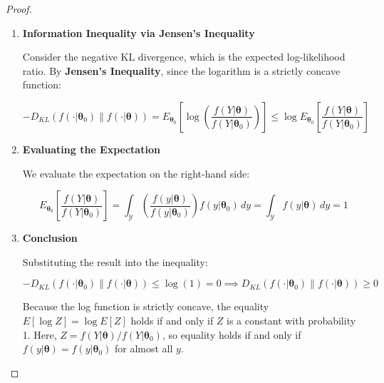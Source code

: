 \documentclass[
  letterpaper,
  DIV=11,
  numbers=noendperiod]{scrreprt}
\renewcommand{\[}{\begin{equation}}
\renewcommand{\]}{\end{equation}}
\theoremstyle{definition}
\theoremstyle{plain}
\theoremstyle{plain}
\theoremstyle{plain}
\theoremstyle{definition}
\theoremstyle{plain}
\theoremstyle{remark}
\begin{document}
\begin{proof}
\leavevmode

\begin{enumerate}
\def\labelenumi{\arabic{enumi}.}
\item
  \textbf{Information Inequality via Jensen's Inequality}

  Consider the negative KL divergence, which is the expected
  log-likelihood ratio. By \textbf{Jensen's Inequality}, since the
  logarithm is a strictly concave function:

  \[
  -D_{KL}(f(\cdot|\boldsymbol{\theta}_0) \| f(\cdot|\boldsymbol{\theta})) = E_{\boldsymbol{\theta}_0} \left[ \log \left( \frac{f(Y|\boldsymbol{\theta})}{f(Y|\boldsymbol{\theta}_0)} \right) \right] \le \log E_{\boldsymbol{\theta}_0} \left[ \frac{f(Y|\boldsymbol{\theta})}{f(Y|\boldsymbol{\theta}_0)} \right]
  \]
\item
  \textbf{Evaluating the Expectation}

  We evaluate the expectation on the right-hand side:

  \[
  E_{\boldsymbol{\theta}_0} \left[ \frac{f(Y|\boldsymbol{\theta})}{f(Y|\boldsymbol{\theta}_0)} \right] = \int_{\mathcal{Y}} \left( \frac{f(y|\boldsymbol{\theta})}{f(y|\boldsymbol{\theta}_0)} \right) f(y|\boldsymbol{\theta}_0) \, dy = \int_{\mathcal{Y}} f(y|\boldsymbol{\theta}) \, dy = 1
  \]
\item
  \textbf{Conclusion}

  Substituting the result into the inequality:

  \[
  -D_{KL}(f(\cdot|\boldsymbol{\theta}_0) \| f(\cdot|\boldsymbol{\theta})) \le \log(1) = 0 \implies D_{KL}(f(\cdot|\boldsymbol{\theta}_0) \| f(\cdot|\boldsymbol{\theta})) \ge 0
  \]

  Because the log function is strictly concave, the equality
  \(E[\log Z] = \log E[Z]\) holds if and only if \(Z\) is a constant
  with probability 1. Here,
  \(Z = f(Y|\boldsymbol{\theta})/f(Y|\boldsymbol{\theta}_0)\), so
  equality holds if and only if
  \(f(y|\boldsymbol{\theta}) = f(y|\boldsymbol{\theta}_0)\) for almost
  all \(y\).
\end{enumerate}

\end{proof}
\end{document}
